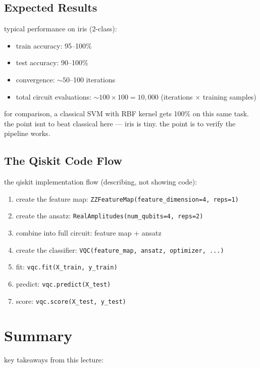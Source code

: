 \documentclass[11pt,a4paper]{article}
\theoremstyle{definition}
\theoremstyle{remark}
\begin{document}
\subsection{Expected Results}

typical performance on iris (2-class):
\begin{itemize}
    \item train accuracy: 95--100\%
    \item test accuracy: 90--100\%
    \item convergence: $\sim 50$--100 iterations
    \item total circuit evaluations: $\sim 100 \times 100 = 10{,}000$ (iterations $\times$ training samples)
\end{itemize}

for comparison, a classical SVM with RBF kernel gets 100\% on this same task. the point isnt to beat classical here --- iris is tiny. the point is to verify the pipeline works.

\subsection{The Qiskit Code Flow}

the qiskit implementation flow (describing, not showing code):
\begin{enumerate}
    \item create the feature map: \texttt{ZZFeatureMap(feature\_dimension=4, reps=1)}
    \item create the ansatz: \texttt{RealAmplitudes(num\_qubits=4, reps=2)}
    \item combine into full circuit: feature map + ansatz
    \item create the classifier: \texttt{VQC(feature\_map, ansatz, optimizer, ...)}
    \item fit: \texttt{vqc.fit(X\_train, y\_train)}
    \item predict: \texttt{vqc.predict(X\_test)}
    \item score: \texttt{vqc.score(X\_test, y\_test)}
\end{enumerate}

\section{Summary}

key takeaways from this lecture:
\end{document}
